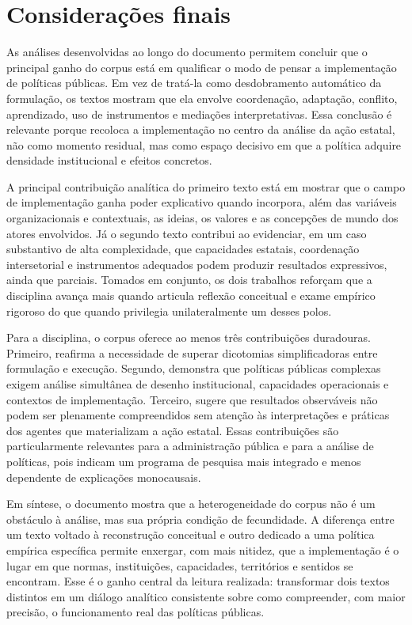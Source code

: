\documentclass[12pt,a4paper]{article}
\begin{document}
\section{Considerações finais}
\label{sec:orgdf18372}

As análises desenvolvidas ao longo do documento permitem concluir que o principal ganho do corpus está em qualificar o modo de pensar a implementação de políticas públicas. Em vez de tratá-la como desdobramento automático da formulação, os textos mostram que ela envolve coordenação, adaptação, conflito, aprendizado, uso de instrumentos e mediações interpretativas. Essa conclusão é relevante porque recoloca a implementação no centro da análise da ação estatal, não como momento residual, mas como espaço decisivo em que a política adquire densidade institucional e efeitos concretos. \parencite{ascenzi2013_implementacao_politicas,mello2017_evolucao_plano}

A principal contribuição analítica do primeiro texto está em mostrar que o campo de implementação ganha poder explicativo quando incorpora, além das variáveis organizacionais e contextuais, as ideias, os valores e as concepções de mundo dos atores envolvidos. Já o segundo texto contribui ao evidenciar, em um caso substantivo de alta complexidade, que capacidades estatais, coordenação intersetorial e instrumentos adequados podem produzir resultados expressivos, ainda que parciais. Tomados em conjunto, os dois trabalhos reforçam que a disciplina avança mais quando articula reflexão conceitual e exame empírico rigoroso do que quando privilegia unilateralmente um desses polos. \parencite{ascenzi2013_implementacao_politicas,mello2017_evolucao_plano}

Para a disciplina, o corpus oferece ao menos três contribuições duradouras. Primeiro, reafirma a necessidade de superar dicotomias simplificadoras entre formulação e execução. Segundo, demonstra que políticas públicas complexas exigem análise simultânea de desenho institucional, capacidades operacionais e contextos de implementação. Terceiro, sugere que resultados observáveis não podem ser plenamente compreendidos sem atenção às interpretações e práticas dos agentes que materializam a ação estatal. Essas contribuições são particularmente relevantes para a administração pública e para a análise de políticas, pois indicam um programa de pesquisa mais integrado e menos dependente de explicações monocausais. \parencite{ascenzi2013_implementacao_politicas,mello2017_evolucao_plano}

Em síntese, o documento mostra que a heterogeneidade do corpus não é um obstáculo à análise, mas sua própria condição de fecundidade. A diferença entre um texto voltado à reconstrução conceitual e outro dedicado a uma política empírica específica permite enxergar, com mais nitidez, que a implementação é o lugar em que normas, instituições, capacidades, territórios e sentidos se encontram. Esse é o ganho central da leitura realizada: transformar dois textos distintos em um diálogo analítico consistente sobre como compreender, com maior precisão, o funcionamento real das políticas públicas. \parencite{ascenzi2013_implementacao_politicas,mello2017_evolucao_plano}
\end{document}
